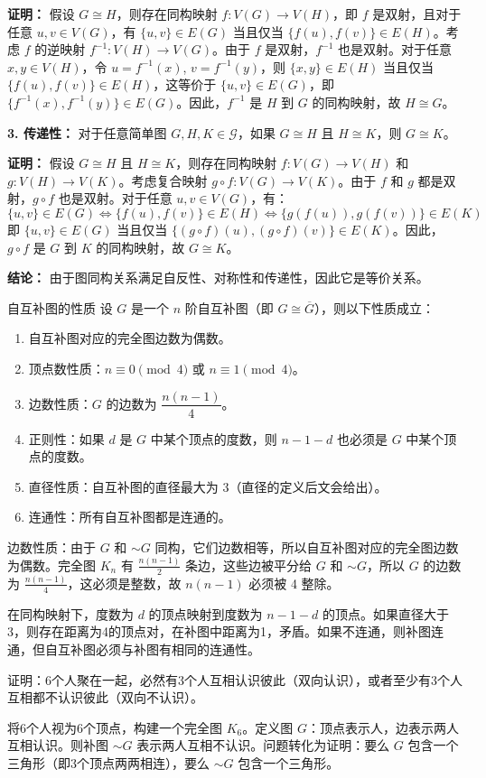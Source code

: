 \documentclass[lang=cn,11pt]{elegantbook}
\begin{document}
\textbf{证明：}
假设 $G \cong H$，则存在同构映射 $f: V(G) \to V(H)$，即 $f$ 是双射，且对于任意 $u, v \in V(G)$，有 $\{u, v\} \in E(G)$ 当且仅当 $\{f(u), f(v)\} \in E(H)$。考虑 $f$ 的逆映射 $f^{-1}: V(H) \to V(G)$。由于 $f$ 是双射，$f^{-1}$ 也是双射。对于任意 $x, y \in V(H)$，令 $u = f^{-1}(x)$, $v = f^{-1}(y)$，则 $\{x, y\} \in E(H)$ 当且仅当 $\{f(u), f(v)\} \in E(H)$，这等价于 $\{u, v\} \in E(G)$，即 $\{f^{-1}(x), f^{-1}(y)\} \in E(G)$。因此，$f^{-1}$ 是 $H$ 到 $G$ 的同构映射，故 $H \cong G$。

\textbf{3. 传递性：} 对于任意简单图 $G, H, K \in \mathcal{G}$，如果 $G \cong H$ 且 $H \cong K$，则 $G \cong K$。

\textbf{证明：}
假设 $G \cong H$ 且 $H \cong K$，则存在同构映射 $f: V(G) \to V(H)$ 和 $g: V(H) \to V(K)$。考虑复合映射 $g \circ f: V(G) \to V(K)$。由于 $f$ 和 $g$ 都是双射，$g \circ f$ 也是双射。对于任意 $u, v \in V(G)$，有：
\[
\{u, v\} \in E(G) \iff \{f(u), f(v)\} \in E(H) \iff \{g(f(u)), g(f(v))\} \in E(K)
\]
即 $\{u, v\} \in E(G)$ 当且仅当 $\{(g \circ f)(u), (g \circ f)(v)\} \in E(K)$。因此，$g \circ f$ 是 $G$ 到 $K$ 的同构映射，故 $G \cong K$。

\textbf{结论：}
由于图同构关系满足自反性、对称性和传递性，因此它是等价关系。
\begin{theorem}{自互补图的性质}
设 $G$ 是一个 $n$ 阶自互补图（即 $G \cong \overline{G}$），则以下性质成立：
\begin{enumerate}[itemsep=2pt, parsep=2pt, topsep=5pt, label=(\arabic*)]
    \item 自互补图对应的完全图边数为偶数。
    \item 顶点数性质：$n \equiv 0 \pmod{4}$ 或 $n \equiv 1 \pmod{4}$。
    \item 边数性质：$G$ 的边数为 $\dfrac{n(n-1)}{4}$。
    \item 正则性：如果 $d$ 是 $G$ 中某个顶点的度数，则 $n-1-d$ 也必须是 $G$ 中某个顶点的度数。
    \item 直径性质：自互补图的直径最大为 3（直径的定义后文会给出）。
    \item 连通性：所有自互补图都是连通的。
\end{enumerate}
\end{theorem}
边数性质：由于 $G$ 和 $\sim G$ 同构，它们边数相等，所以自互补图对应的完全图边数为偶数。完全图 $K_n$ 有 $\frac{n(n-1)}{2}$ 条边，这些边被平分给 $G$ 和 $\sim G$，所以 $G$ 的边数为 $\frac{n(n-1)}{4}$，这必须是整数，故 $n(n-1)$ 必须被 4 整除。

在同构映射下，度数为 $d$ 的顶点映射到度数为 $n-1-d$ 的顶点。如果直径大于3，则存在距离为4的顶点对，在补图中距离为1，矛盾。如果不连通，则补图连通，但自互补图必须与补图有相同的连通性。
\begin{example}
    证明：6个人聚在一起，必然有3个人互相认识彼此（双向认识），或者至少有3个人互相都不认识彼此（双向不认识）。
\end{example}
将6个人视为6个顶点，构建一个完全图 $K_6$。定义图 $G$：顶点表示人，边表示两人互相认识。则补图 $\sim G$ 表示两人互相不认识。问题转化为证明：要么 $G$ 包含一个三角形（即3个顶点两两相连），要么 $\sim G$ 包含一个三角形。
\end{document}

